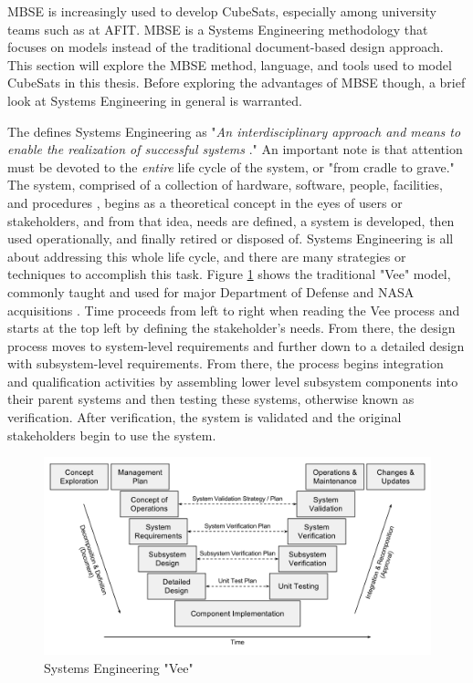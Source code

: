 MBSE is increasingly used to develop CubeSats, especially among university teams such as at AFIT. MBSE is a Systems Engineering methodology that focuses on models instead of the traditional document-based design approach. This section will explore the MBSE method, language, and tools used to model CubeSats in this thesis. Before exploring the advantages of MBSE though, a brief look at Systems Engineering in general is warranted. 

The  defines Systems Engineering as "\textit{An interdisciplinary approach and means to enable the realization of successful systems} \citep{Buede2016}." An important note is that attention must be devoted to the \textit{entire} life cycle of the system, or "from cradle to grave." The system, comprised of a collection of hardware, software, people, facilities, and procedures \citep{Buede2016}, begins as a theoretical concept in the eyes of users or stakeholders, and from that idea, needs are defined, a system is developed, then used operationally, and finally retired or disposed of. Systems Engineering is all about addressing this whole life cycle, and there are many strategies or techniques to accomplish this task. Figure \ref{fig:Systems Engineering "Vee"} shows the traditional "Vee" model, commonly taught and used for major Department of Defense and NASA acquisitions \citep{Buede2016}. Time proceeds from left to right when reading the Vee process and starts at the top left by defining the stakeholder's needs. From there, the design process moves to system-level requirements and further down to a detailed design with subsystem-level requirements. From there, the process begins integration and qualification activities by assembling lower level subsystem components into their parent systems and then testing these systems, otherwise known as verification. After verification, the system is validated and the original stakeholders begin to use the system.

\begin{figure}[H]
    \centering
    \includegraphics[width=\textwidth]{Thesis/Literature_Review/Lit Review Figures/sysengvee.png}
    \caption{Systems Engineering "Vee"}
    \label{fig:Systems Engineering "Vee"}
\end{figure}

